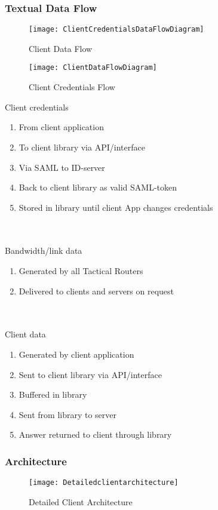 		
	\subsubsection{Textual Data Flow}\label{textual client data flow}
        \begin{figure}[h]
        \centering
        \texttt{[image: ClientCredentialsDataFlowDiagram]}
        \caption{Client Data Flow}
        \label{fig:ClientCredentialsDataFlowDiagram}
    \end{figure}
    
    \begin{figure}[h]
        \centering
        \texttt{[image: ClientDataFlowDiagram]}
        \caption{Client Credentials Flow}
        \label{fig:ClientDataFlowDiagram}
    \end{figure}
    
		Client credentials
		\begin{enumerate}
			\item From client application
			\item To client library via API/interface
			\item Via SAML to ID-server
			\item Back to client library as valid SAML-token
			\item Stored in library until client App changes credentials
		\end{enumerate}
		\\\\
		Bandwidth/link data
		\begin{enumerate}
			\item Generated by all Tactical Routers
			\item Delivered to clients and servers on request
		\end{enumerate}
		\\\\
		Client data
		\begin{enumerate}
			\item Generated by client application
			\item Sent to client library via API/interface
			\item Buffered in library
			\item Sent from library to server
			\item Answer returned to client through library
		\end{enumerate}
		
	\subsubsection{Architecture}\label{client architecture}
		\begin{figure}[h]
			\centering	
			\texttt{[image: Detailedclientarchitecture]}
			\caption{Detailed Client Architecture}
			\label{fig:DetailedClientArchitecture}
		\end{figure}

